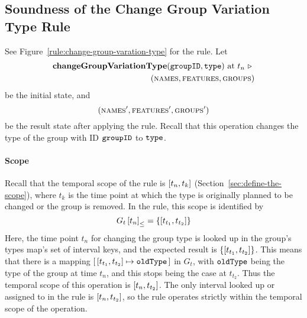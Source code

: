 

\subsection{Soundness of the Change Group Variation Type Rule} 
\label{sub:soundness-of-the-change-group-variation-type-rule}

See Figure~\vref{rule:change-group-varation-type} for the  rule. Let 
\begin{equation*}
   \begin{split}
      \textbf{changeGroupVariationType}(\texttt{groupID}, \texttt{type}) \text{ at } t_n \ \triangleright \  \\
      (\textsc{names}, \textsc{features}, \textsc{groups}{})
   \end{split}
\end{equation*}
be the initial state, and
\[
   (\textsc{names}', \textsc{features}', \textsc{groups}{}')
\]
be the result state after applying the  rule. Recall that this operation changes the type of the group with ID $\texttt{groupID}$ to $\texttt{type}$.

\paragraph{Scope}
Recall that the temporal scope of the  rule is $\interval{t_n}{t_k}$ (Section~\vref{sec:define-the-scope}), where $t_k$ is the time point at which the type is originally planned to be changed or the group is removed. In the rule, this scope is identified by 
   \[
      \containing{G_t}{t_n} = \set{\interval{t_{t_1}}{t_{t_2}}}
   \]
   Here, the time point $t_n$ for changing the group type is looked up in the group's types map's set of interval keys, and the expected result is $\set{\interval{t_{t_1}}{t_{t_2}}}$. This means that there is a mapping $\intervalmapping{t_{t_1}}{t_{t_2}}{\var{oldType}}$ in $G_t$, with $\texttt{oldType}$ being the type of the group at time $t_n$, and this stops being the case at $t_{t_2}$. Thus the temporal scope of this operation is $\interval{t_n}{t_{t_2}}$. The only interval looked up or assigned to in the rule is $\interval{t_n}{t_{t_2}}$, so the rule operates strictly within the temporal scope of the operation.

